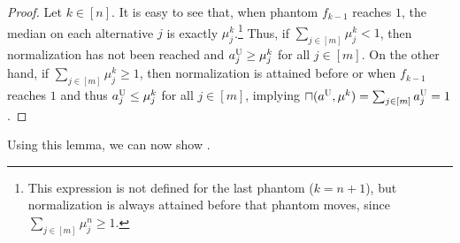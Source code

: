 \documentclass[11pt]{article}
\newcommand{\overlap}[2]{\sqcap(#1, #2)}
\newcommand{\Uts}{\textsc{U} } %
\begin{document}
\begin{proof}
    Let $k \in [n]$. It is easy to see that, when 
    phantom $f_{k-1}$
    reaches $1$, the median on each alternative $j$ is exactly $\mu^k_j$.\footnote{This expression is not defined for the last phantom ($k = n+1$), but normalization is always attained before that phantom moves, since $\sum_{j\in[m]} \mu^n_j \ge 1$.} Thus, if $\sum_{j \in [m]} \mu^k_j < 1$, then normalization has not been reached and $a^\Uts_j \ge \mu^k_j$ for all $j \in [m]$. On the other hand, if $\sum_{j \in [m]} \mu^k_j \ge 1$, then normalization is attained before or when 
    $f_{k-1}$
    reaches $1$ and thus $a^\Uts_j \le \mu^k_j$ for all $j \in [m]$, implying $\overlap{a^\Uts}{\mu^k} = \sum_{j\in [m]} a^\Uts_j = 1$.
\end{proof}


Using this lemma, we can now show .
\end{document}
